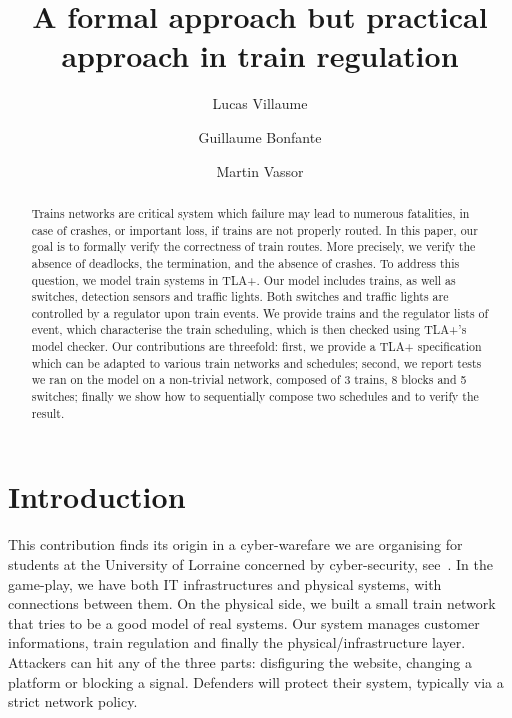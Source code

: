 \documentclass[runningheads]{llncs}
\begin{document}
%
\title{A formal approach but practical approach in train regulation}
%
%
\author{Lucas Villaume \and Guillaume Bonfante \and Martin Vassor  }
%
%
%
\maketitle
%
\begin{abstract}
	Trains networks are critical system which failure may lead to numerous fatalities, in case of crashes, or important loss, if trains are not properly routed. 
	In this paper, our goal is to formally verify the correctness of train routes. More precisely, we verify the absence of deadlocks, the termination, and the absence of crashes.
	To address this question, we model train systems in TLA+. Our model includes trains, as well as switches, detection sensors and traffic lights. Both switches and traffic lights are controlled by a regulator upon train events. We provide trains and the regulator lists of event, which characterise the train scheduling, which is then checked using TLA+'s model checker.
	Our contributions are threefold: first, we provide a TLA+ specification which can be adapted to various train networks and schedules; second, we report tests we ran on the model on a non-trivial network, composed of 3 trains, 8 blocks and 5 switches; finally we show how to sequentially compose two schedules and to verify the result.

\end{abstract}


\section{Introduction}
\label{sec:introduction}

This contribution finds its origin in a cyber-warefare we are organising for students at the University of Lorraine concerned by cyber-security, see~\cite{CHE}. In the game-play, we have both IT infrastructures and physical systems, with connections between them. On the physical side, we built a small train network that tries to be a good model of real systems.  Our system manages customer informations, train regulation and finally the physical/infrastructure layer. Attackers can hit any of the three parts: disfiguring the website, changing a platform or blocking a signal. Defenders will protect their system, typically via a strict network policy.
\end{document}
